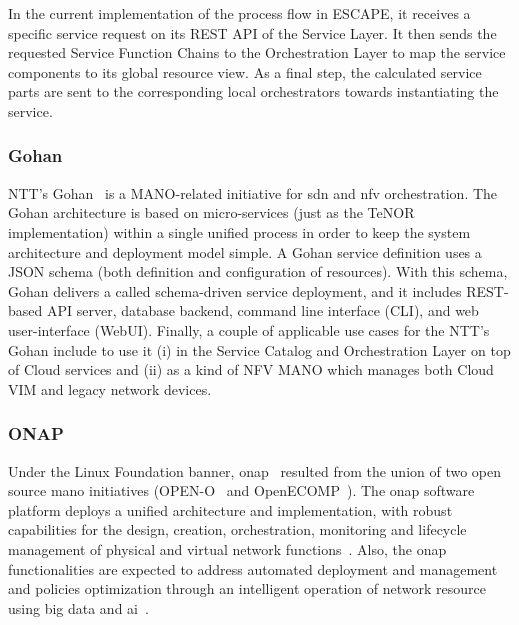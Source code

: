 In the current implementation of the process flow in ESCAPE, it receives a specific service request on its REST API of the Service Layer. It then sends the requested Service Function Chains to the Orchestration Layer to map the service components to its global resource view. As a final step, the calculated service parts are sent to the corresponding local orchestrators towards instantiating the service.

\subsubsection{Gohan}
NTT's Gohan~\cite{gohan} is a MANO-related initiative for \gls{sdn} and \gls{nfv} orchestration. The Gohan architecture is based on micro-services (just as the TeNOR implementation) within a single unified process in order to keep the system architecture and deployment model simple. A Gohan service definition uses a JSON schema (both definition and configuration of resources). With this schema, Gohan delivers a called schema-driven service deployment, and it includes REST-based API server, database backend, command line interface (CLI), and web user-interface (WebUI). Finally, a couple of applicable use cases for the NTT's Gohan include to use it (i) in the Service Catalog and Orchestration Layer on top of Cloud services and (ii) as a kind of NFV MANO which manages both Cloud VIM and legacy network devices. 

\subsubsection{ONAP}
Under the Linux Foundation banner, \acrfull{onap}~\cite{onap} resulted from the union of two open source \gls{mano} initiatives (OPEN-O~\cite{Foundation} and OpenECOMP~\cite{ATT2016ECOMPPaper}). The \gls{onap} software platform deploys a unified architecture and implementation, with robust capabilities for the design, creation, orchestration, monitoring and lifecycle management of physical and virtual network functions~\cite{onapwiki}. Also, the \gls{onap} functionalities are expected to address automated deployment and management and policies optimization through an intelligent operation of network resource using big data and \gls{ai}~\cite{onapconvergedigest}.


